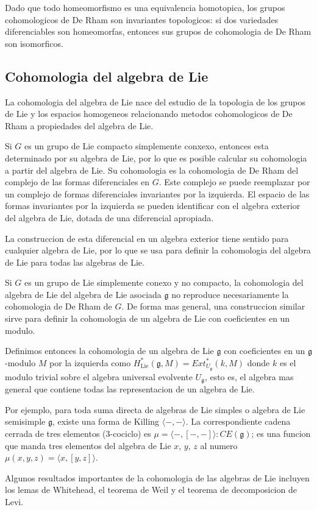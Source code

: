 \documentclass[12pt]{extarticle}
\newcommand{\<}{\langle}
\renewcommand{\>}{\rangle}
\theoremstyle{definition}
\begin{document}
Dado que todo homeomorfismo es una equivalencia homotopica, los grupos
cohomologicos de De Rham son invariantes topologicos: si dos variedades
diferenciables son homeomorfas, entonces sus grupos de cohomologia de De Rham
son isomorficos.

\subsection{Cohomologia del algebra de Lie}

La cohomologia del algebra de Lie nace del estudio de
la topologia de los grupos de Lie y los espacios homogeneos relacionando metodos
cohomologicos de De Rham a propiedades del algebra de Lie.

Si $G$ es un grupo de Lie compacto simplemente conxexo, entonces esta
determinado por su algebra de Lie, por lo que es posible calcular su cohomologia
a partir del algebra de Lie. Su cohomologia es la cohomologia de De Rham del
complejo de las formas diferenciales en $G$. Este complejo se puede reemplazar
por un complejo de formas diferenciales invariantes por la izquierda. El espacio
de las formas
invariantes por la izquierda se pueden identificar con el algebra exterior del
algebra de Lie, dotada de una diferencial apropiada.

La construccion de esta diferencial en un algebra exterior tiene sentido para
cualquier algebra de Lie, por lo que se usa para definir la cohomologia del
algebra de Lie para todas las algebras de Lie.

Si $G$ es un grupo de Lie simplemente conexo y no compacto, la cohomologia del
algebra de Lie del algebra de Lie asociada $\mathfrak{g}$ no reproduce
necesariamente la cohomologia de De Rham de $G$. De forma mas general, una
construccion similar sirve para definir la cohomologia de un algebra de Lie con
coeficientes en un modulo.

Definimos entonces la cohomologia de un algebra de Lie $\mathfrak{g}$ con coeficientes en
un $\mathfrak{g}$-modulo $M$ por la izquierda como
$H^*_{\text{Lie}}(\mathfrak{g},M)=Ext^*_{U_{\mathfrak{g}}}(k, M)$ donde $k$ es
el modulo trivial sobre el
algebra universal evolvente $U_{\mathfrak{g}}$, esto es, el algebra mas general
que contiene todas las representacion de un algebra de Lie.

Por ejemplo, para toda suma directa de algebras de
Lie simples o algebra de Lie semisimple $\mathfrak{g}$, existe una forma
de Killing $\langle-,-\rangle$. La correspondiente cadena cerrada de tres elementos (3-cociclo) es $\mu =
\langle-,[-,-]\rangle:CE(\mathfrak{g})$; es una funcion que manda tres elementos del
algebra de Lie $x$, $y$, $z$ al numero $\mu (x,y,z)=\langle x,[y,z]\rangle $.

Algunos resultados importantes de la cohomologia de las algebras de Lie incluyen
los lemas de Whitehead, el teorema de Weil y el teorema de decomposicion de
Levi.
\end{document}
